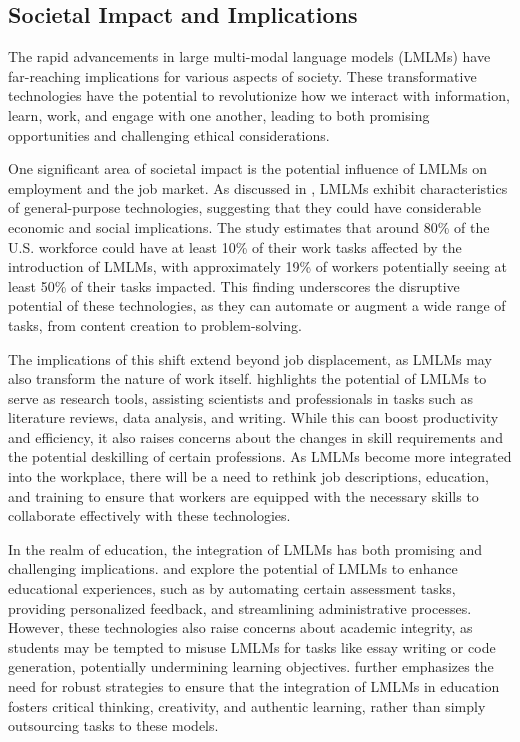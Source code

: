 \documentclass[11pt]{article}
\begin{document}
\subsection{Societal Impact and Implications}

The rapid advancements in large multi-modal language models (LMLMs) have far-reaching implications for various aspects of society. These transformative technologies have the potential to revolutionize how we interact with information, learn, work, and engage with one another, leading to both promising opportunities and challenging ethical considerations.

One significant area of societal impact is the potential influence of LMLMs on employment and the job market. As discussed in \cite{ref284}, LMLMs exhibit characteristics of general-purpose technologies, suggesting that they could have considerable economic and social implications. The study estimates that around 80\% of the U.S. workforce could have at least 10\% of their work tasks affected by the introduction of LMLMs, with approximately 19\% of workers potentially seeing at least 50\% of their tasks impacted. This finding underscores the disruptive potential of these technologies, as they can automate or augment a wide range of tasks, from content creation to problem-solving.

The implications of this shift extend beyond job displacement, as LMLMs may also transform the nature of work itself. \cite{ref285} highlights the potential of LMLMs to serve as research tools, assisting scientists and professionals in tasks such as literature reviews, data analysis, and writing. While this can boost productivity and efficiency, it also raises concerns about the changes in skill requirements and the potential deskilling of certain professions. As LMLMs become more integrated into the workplace, there will be a need to rethink job descriptions, education, and training to ensure that workers are equipped with the necessary skills to collaborate effectively with these technologies.

In the realm of education, the integration of LMLMs has both promising and challenging implications. \cite{ref286} and \cite{ref90} explore the potential of LMLMs to enhance educational experiences, such as by automating certain assessment tasks, providing personalized feedback, and streamlining administrative processes. However, these technologies also raise concerns about academic integrity, as students may be tempted to misuse LMLMs for tasks like essay writing or code generation, potentially undermining learning objectives. \cite{ref287} further emphasizes the need for robust strategies to ensure that the integration of LMLMs in education fosters critical thinking, creativity, and authentic learning, rather than simply outsourcing tasks to these models.
\end{document}
